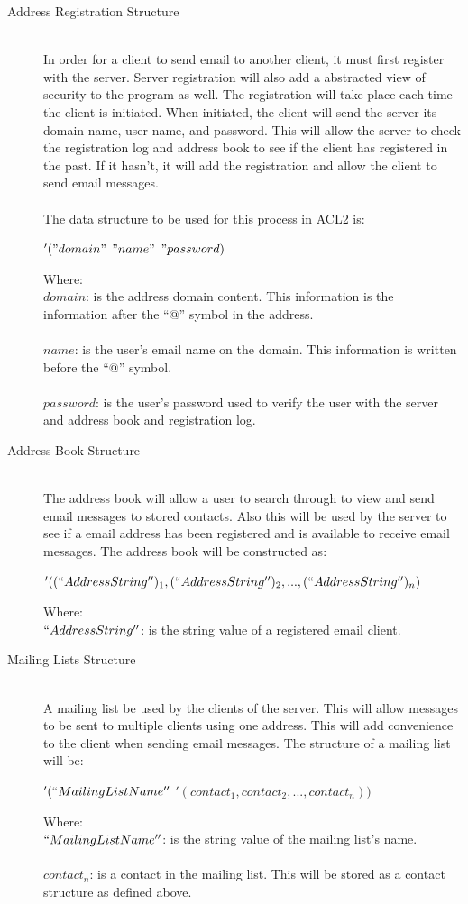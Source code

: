 \documentclass[11pt, letterpaper]{report}
\begin{document}
\begin{description}
\newpage
\item[Address Registration Structure] \hfill \\ 
In order for a client to send email to another client, it must first register with the server. Server registration will also add a abstracted view of security to the program as well. The registration will take place each time the client is initiated. When initiated, the client will send the server its domain name, user name, and password. This will allow the server to check the registration log and address book to see if the client has registered in the past. If it hasn't, it will add the registration and allow the client to send email messages. \\ \\
The data structure to be used for this process in ACL2 is: 
\begin{center} $'("domain"$ $"name"$  $"password)$\end{center}
Where: \\ 
$domain$: is the address domain content. This information is the information after the ``@'' symbol in the address. \\ \\
$name$: is the user's email name on the domain. This information is written before the ``@'' symbol. \\ \\
$password$: is the user's password used to verify the user with the server and address book and registration log.

\item[Address Book Structure] \hfill \\
The address book will allow a user to search through to view and send email messages to stored contacts. Also this will be used by the server to see if a email address has been registered and is available to receive email messages. The address book will be constructed as: 
\begin{center} $'((``Address String'')_1, (``Address String'')_2, ..., (``Address String'')_n)$ \end{center}
Where: \\
$``Address String''$: is the string value of a registered email client.

\item[Mailing Lists Structure] \hfill \\
A mailing list be used by the clients of the server. This will allow messages to be sent to multiple clients using one address. This will add convenience to the client when sending email messages. The structure of a mailing list will be: 
\begin{center}$ '(``MailingListName''$ $'(contact_1 , contact_2 , ..., contact_n ))$\end{center}
Where:\\
$``MailingListName''$: is the string value of the mailing list's name. \\ \\
$contact_n$: is a contact in the mailing list. This will be stored as a contact structure as defined above.



\end{description}
\end{document}
